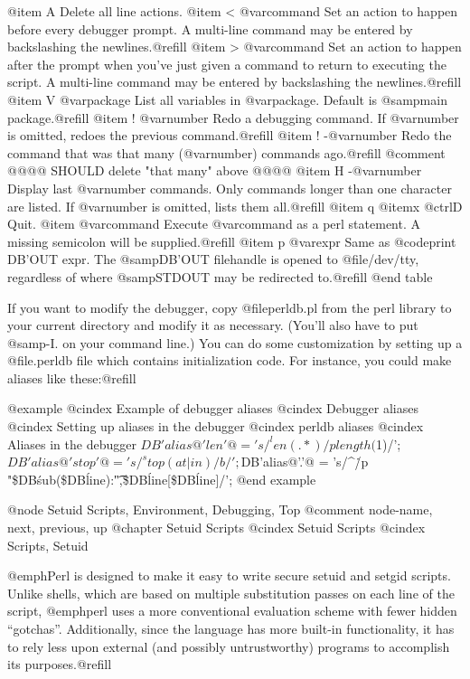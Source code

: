 {{{{{{{{{{{{{@item A
Delete all line actions.
@item < @var{command}
Set an action to happen before every debugger prompt.  A multi-line command
may be entered by backslashing the newlines.@refill
@item > @var{command}
Set an action to happen after the prompt when you've just given a command
to return to executing the script.  A multi-line command may be entered by
backslashing the newlines.@refill
@item V @var{package}
List all variables in @var{package}.  Default is @samp{main}
package.@refill
@item ! @var{number}
Redo a debugging command.  If @var{number} is omitted, redoes the previous
command.@refill
@item ! -@var{number}
Redo the command that was that many (@var{number}) commands ago.@refill
@comment @@@@ SHOULD delete "that many" above @@@@
@item H -@var{number}
Display last @var{number} commands.  Only commands longer than one
character are listed.  If @var{number} is omitted, lists them all.@refill
@item q
@itemx @ctrl{D}
Quit.
@item @var{command}
Execute @var{command} as a perl statement.  A missing semicolon will be
supplied.@refill
@item p @var{expr}
Same as @code{print DB'OUT expr}.  The @samp{DB'OUT} filehandle is opened
to @file{/dev/tty}, regardless of where @samp{STDOUT} may be redirected
to.@refill
@end table

If you want to modify the debugger, copy @file{perldb.pl} from the perl
library to your current directory and modify it as necessary.  (You'll
also have to put @samp{-I.} on your command line.)  You can do some
customization by setting up a @file{.perldb} file which contains
initialization code.  For instance, you could make aliases like
these:@refill

@example
@cindex Example of debugger aliases
@cindex Debugger aliases
@cindex Setting up aliases in the debugger
@cindex perldb aliases
@cindex Aliases in the debugger
$DB'alias@{'len'@} = 's/^len(.*)/p length($1)/';
$DB'alias@{'stop'@} = 's/^stop (at|in)/b/';
$DB'alias@{'.'@} =
  's/^\./p "\$DB\'sub(\$DB\'line):\t",\$DB\'line[\$DB\'line]/';
@end example

@node     Setuid Scripts, Environment, Debugging, Top
@comment  node-name,  next,  previous,  up
@chapter Setuid Scripts
@cindex Setuid Scripts
@cindex Scripts, Setuid

@emph{Perl} is designed to make it easy to write secure setuid and setgid
scripts.  Unlike shells, which are based on multiple substitution passes on
each line of the script, @emph{perl} uses a more conventional evaluation
scheme with fewer hidden ``gotchas''.  Additionally, since the language has
more built-in functionality, it has to rely less upon external (and
possibly untrustworthy) programs to accomplish its purposes.@refill

}}}}}}}}}}}}}
